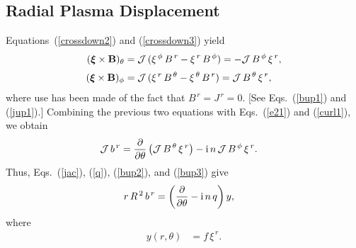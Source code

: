 \documentclass[12pt,prb,aps]{revtex4-1}
\newcommand {\bxi}{\mbox{\boldmath$\xi$}}
\begin{document}
\subsection{Radial Plasma Displacement}
Equations~(\ref{crossdown2}) and (\ref{crossdown3}) yield
\begin{align}
(\bxi\times {\bf B})_\theta&= {\cal J}\,(\xi^{\,\phi}\,B^{\,r} - \xi^{\,r}\,B^{\,\phi}) = -{\cal J}\,B^{\,\phi}\,\xi^{\,r},\\[0.5ex]
(\bxi\times {\bf B})_\phi &= {\cal J}\,(\xi^{\,r}\,B^{\,\theta} - \xi^{\,\theta}\,B^{\,r})= {\cal J}\,B^{\,\theta}\,\xi^{\,r},
\end{align}
where use has been made of  the fact that $B^{\,r}=J^{\,r}=0$. [See Eqs.~(\ref{bup1}) and (\ref{jup1}).]
Combining the previous two equations with  Eqs.~(\ref{e21}) and (\ref{curl1}), we obtain
\begin{align}
{\cal J}\,b^{\,r} &= \frac{\partial}{\partial\theta}\left({\cal J}\,B^{\,\theta}\,\xi^{\,r}\right)-{\rm i}\,n\,{\cal J}\,B^{\,\phi}\,\xi^{\,r}.
\end{align}
Thus, Eqs.~(\ref{jac}), (\ref{q}), (\ref{bup2}), and (\ref{bup3}) give
\begin{align}\label{e41}
r\,R^{\,2}\,b^{\,r}& = \left(\frac{\partial}{\partial\theta}-{\rm i}\,n\,q\right)y,
\end{align}
where 
\begin{align}\label{e42}
y(r,\theta) &=f\,\xi^{\,r}.
\end{align}
\end{document}
